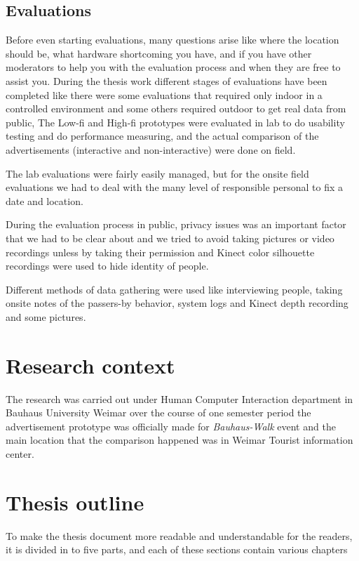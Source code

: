 \subsection{Evaluations}
Before even starting evaluations, many questions arise like where the location should be, what hardware shortcoming you have, and if you have other moderators to help you with the evaluation process and when they are free to assist you. During the thesis work different stages of evaluations have been completed like there were some evaluations that required only indoor in a controlled environment and some others required outdoor to get real data from public, The Low-fi and High-fi prototypes were evaluated in lab to do usability testing and do performance measuring, and the actual comparison of the advertisements (interactive and non-interactive) were done on field. 

The lab evaluations were fairly easily managed, but for the onsite field evaluations we had to deal with the many level of responsible personal to fix a date and location. 

During the evaluation process in public, privacy issues was an important factor that we had to be clear about and we tried to avoid taking pictures or video recordings unless by taking their permission and Kinect color silhouette recordings were used to hide identity of people.

Different methods of data gathering were used like interviewing people, taking onsite notes of the passers-by behavior, system logs and Kinect depth recording and some pictures. 


\section{Research context}
The research was carried out under Human Computer Interaction department in Bauhaus University Weimar over the course of one semester period the advertisement prototype was officially made for \emph{Bauhaus-Walk} event and the main location that the comparison happened was in Weimar Tourist information center.

\newpage
\section{Thesis outline}
To make the thesis document more readable and understandable for the readers, it is divided in to five parts, and each of these sections contain various chapters


